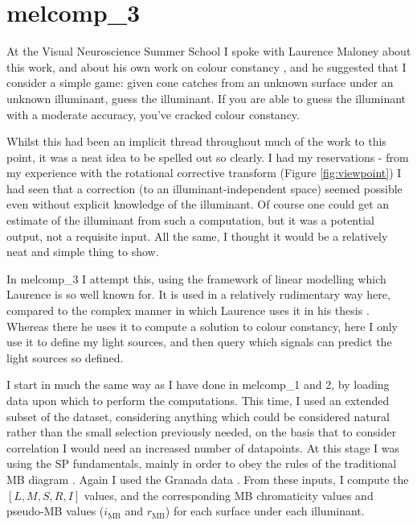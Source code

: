 \section{melcomp\_3}

At the Visual Neuroscience Summer School I spoke with Laurence Maloney about this work, and about his own work on colour constancy \citep{maloney_computational_1984,maloney_color_1986}, and he suggested that I consider a simple game: given cone catches from an unknown surface under an unknown illuminant, guess the illuminant. If you are able to guess the illuminant with a moderate accuracy, you've cracked colour constancy.

Whilst this had been an implicit thread throughout much of the work to this point, it was a neat idea to be spelled out so clearly. I had my reservations - from my experience with the rotational corrective transform (Figure \ref{fig:viewpoint}) I had seen that a correction (to an illuminant-independent space) seemed possible even without explicit knowledge of the illuminant. Of course one could get an estimate of the illuminant from such a computation, but it was a potential output, not a requisite input. All the same, I thought it would be a relatively neat and simple thing to show.

In melcomp\_3 I attempt this, using the framework of linear modelling which Laurence is so well known for. It is used in a relatively rudimentary way here, compared to the complex manner in which Laurence uses it in his thesis \citep{maloney_computational_1984}. Whereas there he uses it to compute a solution to colour constancy, here I only use it to define my light sources, and then query which signals can predict the light sources so defined.

I start in much the same way as I have done in melcomp\_1 and 2, by loading data upon which to perform the computations. This time, I used an extended subset of the \citet{vrhel_measurement_1994} dataset, considering anything which could be considered natural rather than the small selection previously needed, on the basis that to consider correlation I would need an increased number of datapoints. At this stage I was using the \gls{SP} fundamentals, mainly in order to obey the rules of the traditional \gls{MB} diagram \citep{macleod_chromaticity_1979}. Again I used the Granada data \citep{hernandez-andres_color_2001}. From these inputs, I compute the $[L,M,S,R,I]$ values, and the corresponding \gls{MB} chromaticity values and pseudo-MB values ($i_{\text{MB}}$ and $r_{\text{MB}}$) for each surface under each illuminant.

